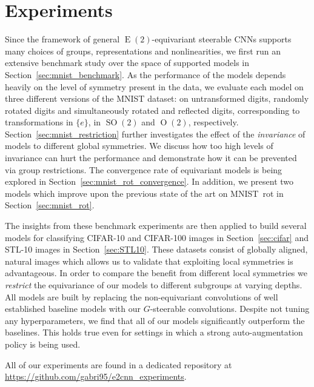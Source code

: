 \documentclass{article}
\newcommand{\E}[1]{\ensuremath{\operatorname{E}(#1)}}
\renewcommand{\O}[1]{\ensuremath{\operatorname{O}(#1)}}
\newcommand{\SO}[1]{\ensuremath{\operatorname{SO}(#1)}}
\newlength{\secBefore}
\newlength{\secAfter}
\newlength{\subsecBefore}
\begin{document}
\vspace*{\secBefore}
\section{Experiments}
\label{sec:experiments}
\vspace*{\secAfter}


Since the framework of general $\E2$-equivariant steerable CNNs supports many choices of groups, representations and nonlinearities, we first run an extensive benchmark study over the space of supported models in Section~\ref{sec:mnist_benchmark}.
As the performance of the models depends heavily on the level of symmetry present in the data, we evaluate each model on three different versions of the MNIST dataset:
on untransformed digits, randomly rotated digits and simultaneously rotated and reflected digits, corresponding to transformations in $\{e\}$, in $\SO2$ and $\O2$, respectively.
Section~\ref{sec:mnist_restriction} further investigates the effect of the \textit{invariance} of models to different global symmetries.
We discuss how too high levels of invariance can hurt the performance and demonstrate how it can be prevented via group restrictions.
The convergence rate of equivariant models is being explored in Section~\ref{sec:mnist_rot_convergence}.
In addition, we present two models which improve upon the previous state of the art on MNIST~rot in Section~\ref{sec:mnist_rot}.

The insights from these benchmark experiments are then applied to build several models for classifying CIFAR-10 and CIFAR-100 images in Section~\ref{sec:cifar} and STL-10 images in Section~\ref{sec:STL10}.
These datasets consist of globally aligned, natural images which allows us to validate that exploiting local symmetries is advantageous.
In order to compare the benefit from different local symmetries we \textit{restrict} the equivariance of our models to different subgroups at varying depths.
All models are built by replacing the non-equivariant convolutions of well established baseline models with our $G$-steerable convolutions.
Despite not tuning any hyperparameters, we find that all of our models significantly outperform the baselines.
This holds true even for settings in which a strong auto-augmentation policy is being used.

All of our experiments are found in a dedicated repository at \url{https://github.com/gabri95/e2cnn_experiments}.


\vspace*{\subsecBefore}
\end{document}
